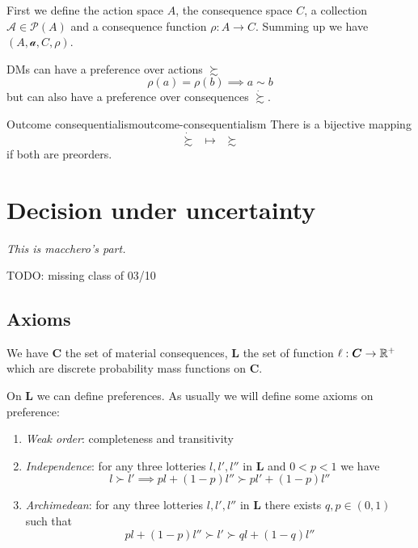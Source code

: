 \documentclass[12pt]{extarticle}
\begin{document}
First we define the action space $A$, the consequence space $C$, a collection $\mathcal A \in \mathcal P(A)$ and a consequence function $\rho: A \to C$.
Summing up we have $(A, \mathcal a, C, \rho)$.

DMs can have a preference over actions $\succsim$
\begin{equation}
    \rho(a) = \rho(b) \implies a \sim b
\end{equation}
but can also have a preference over consequences $\dot \succsim$.

\begin{theorem}{Outcome consequentialism}{outcome-consequentialism}
    There is a bijective mapping
    \begin{equation}
        \dot \succsim \enspace \mapsto \enspace \succsim
    \end{equation}
    if both are preorders.
\end{theorem}

\section{Decision under uncertainty}

\emph{This is macchero's part.}

TODO: missing class of 03/10

\subsection{Axioms}

We have $\bm C$ the set of material consequences, $\bm L$ the set of function $\ell: \bm C \to \mathbb{R}^+$ which are discrete probability mass functions on $\bm C$.

On $\bm L$ we can define preferences.
As usually we will define some axioms on preference:
\begin{enumerate}
    \item \emph{Weak order}: completeness and transitivity
    \item \emph{Independence}: for any three lotteries $l, l', l''$ in $\bm L$ and $0<p<1$ we have
          \begin{equation}
              l \succ l' \implies pl + (1-p) l'' \succ pl' + (1- p)l''
          \end{equation}

    \item \emph{Archimedean}: for any three lotteries $l, l', l''$ in $\bm L$ there exists $q, p \in (0, 1)$ such that
          \begin{equation}
              pl + (1-p)l'' \succ l' \succ ql + (1-q)l''
          \end{equation}
\end{enumerate}
\end{document}

